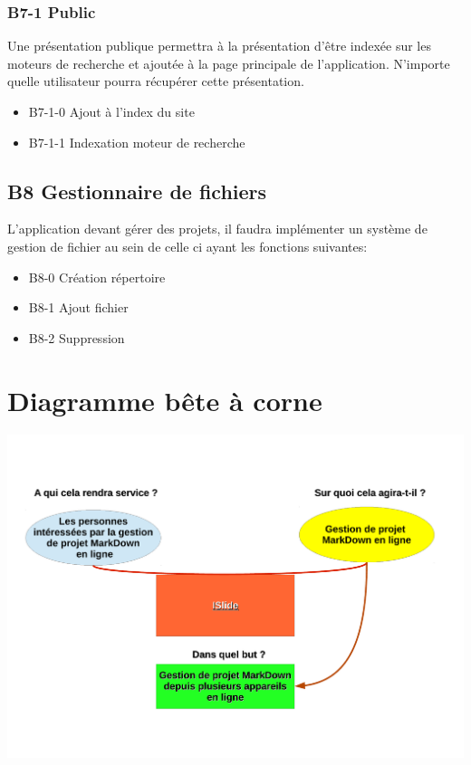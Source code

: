 \documentclass[11pt,a4paper,svgnames]{article}
\begin{document}
\subsubsection{B7-1 Public}
Une présentation publique permettra à la présentation d'être indexée sur les moteurs de recherche et ajoutée à la page principale de l'application. N'importe quelle utilisateur pourra récupérer cette présentation.

\begin{itemize}
\item B7-1-0 Ajout à l'index du site
\item B7-1-1 Indexation moteur de recherche
\end{itemize}

\subsection{B8 Gestionnaire de fichiers}
L'application devant gérer des projets, il faudra implémenter un système de gestion de fichier au sein de celle ci ayant les fonctions suivantes:
\begin{itemize}
\item B8-0 Création répertoire
\item B8-1 Ajout fichier
\item B8-2 Suppression
\end{itemize}



\section{Diagramme bête à corne}

\includegraphics[scale=0.5]{bete-a-corne.pdf}
\end{document}
